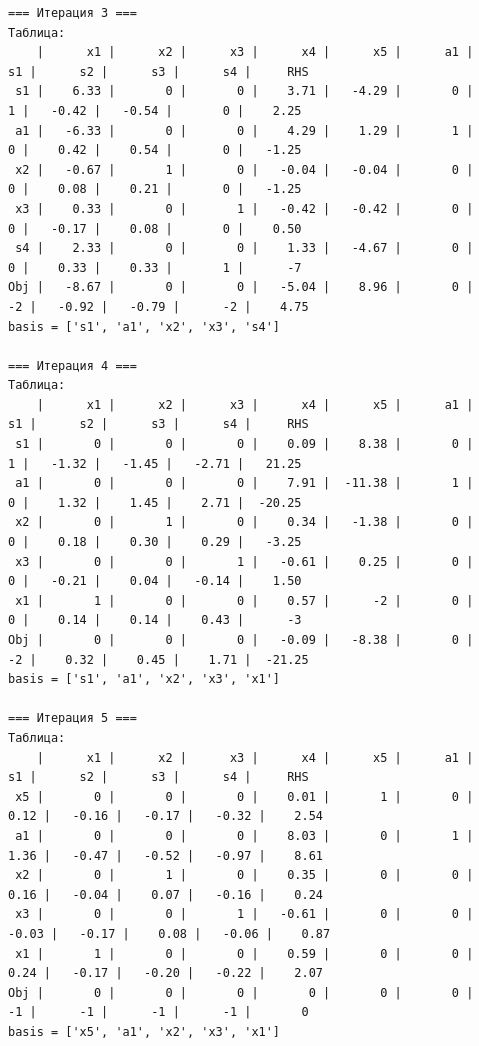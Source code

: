 \documentclass[a4paper,12pt]{article}
\begin{document}
\begin{verbatim}
=== Итерация 3 ===
Таблица:
    |      x1 |      x2 |      x3 |      x4 |      x5 |      a1 |      s1 |      s2 |      s3 |      s4 |     RHS
 s1 |    6.33 |       0 |       0 |    3.71 |   -4.29 |       0 |       1 |   -0.42 |   -0.54 |       0 |    2.25
 a1 |   -6.33 |       0 |       0 |    4.29 |    1.29 |       1 |       0 |    0.42 |    0.54 |       0 |   -1.25
 x2 |   -0.67 |       1 |       0 |   -0.04 |   -0.04 |       0 |       0 |    0.08 |    0.21 |       0 |   -1.25
 x3 |    0.33 |       0 |       1 |   -0.42 |   -0.42 |       0 |       0 |   -0.17 |    0.08 |       0 |    0.50
 s4 |    2.33 |       0 |       0 |    1.33 |   -4.67 |       0 |       0 |    0.33 |    0.33 |       1 |      -7
Obj |   -8.67 |       0 |       0 |   -5.04 |    8.96 |       0 |      -2 |   -0.92 |   -0.79 |      -2 |    4.75
basis = ['s1', 'a1', 'x2', 'x3', 's4']

=== Итерация 4 ===
Таблица:
    |      x1 |      x2 |      x3 |      x4 |      x5 |      a1 |      s1 |      s2 |      s3 |      s4 |     RHS
 s1 |       0 |       0 |       0 |    0.09 |    8.38 |       0 |       1 |   -1.32 |   -1.45 |   -2.71 |   21.25
 a1 |       0 |       0 |       0 |    7.91 |  -11.38 |       1 |       0 |    1.32 |    1.45 |    2.71 |  -20.25
 x2 |       0 |       1 |       0 |    0.34 |   -1.38 |       0 |       0 |    0.18 |    0.30 |    0.29 |   -3.25
 x3 |       0 |       0 |       1 |   -0.61 |    0.25 |       0 |       0 |   -0.21 |    0.04 |   -0.14 |    1.50
 x1 |       1 |       0 |       0 |    0.57 |      -2 |       0 |       0 |    0.14 |    0.14 |    0.43 |      -3
Obj |       0 |       0 |       0 |   -0.09 |   -8.38 |       0 |      -2 |    0.32 |    0.45 |    1.71 |  -21.25
basis = ['s1', 'a1', 'x2', 'x3', 'x1']

=== Итерация 5 ===
Таблица:
    |      x1 |      x2 |      x3 |      x4 |      x5 |      a1 |      s1 |      s2 |      s3 |      s4 |     RHS
 x5 |       0 |       0 |       0 |    0.01 |       1 |       0 |    0.12 |   -0.16 |   -0.17 |   -0.32 |    2.54
 a1 |       0 |       0 |       0 |    8.03 |       0 |       1 |    1.36 |   -0.47 |   -0.52 |   -0.97 |    8.61
 x2 |       0 |       1 |       0 |    0.35 |       0 |       0 |    0.16 |   -0.04 |    0.07 |   -0.16 |    0.24
 x3 |       0 |       0 |       1 |   -0.61 |       0 |       0 |   -0.03 |   -0.17 |    0.08 |   -0.06 |    0.87
 x1 |       1 |       0 |       0 |    0.59 |       0 |       0 |    0.24 |   -0.17 |   -0.20 |   -0.22 |    2.07
Obj |       0 |       0 |       0 |       0 |       0 |       0 |      -1 |      -1 |      -1 |      -1 |       0
basis = ['x5', 'a1', 'x2', 'x3', 'x1']


\end{verbatim}
\end{document}
